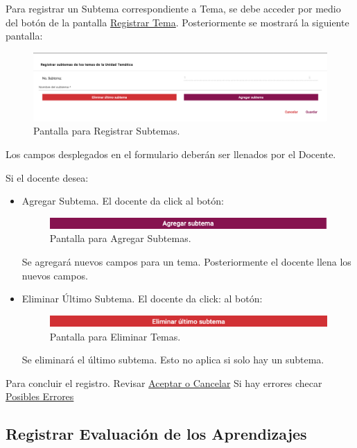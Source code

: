 Para registrar un Subtema correspondiente a Tema, se debe acceder por medio del botón  de la pantalla \hyperlink{RTema}{Registrar Tema}. Posteriormente se mostrará la siguiente pantalla:

\begin{figure}[H]
    \centering
    \includegraphics[width=0.7\linewidth]{images/SP6/RegistrarSubtema.png}
    \caption{Pantalla para Registrar Subtemas.}
\end{figure}

Los campos desplegados en el formulario deberán ser llenados por el Docente.

Si el docente desea:
\begin{itemize}
    \item Agregar Subtema. El docente da click al botón:
    \begin{figure}[H]
    \centering
    \includegraphics[width=0.4\linewidth]{images/SP6/AgregarSubtema.png}
    \caption{Pantalla para Agregar Subtemas.}
    \end{figure}
    Se agregará nuevos campos para un tema. Posteriormente el docente llena los nuevos campos.
    \item Eliminar Último Subtema. El docente da click: al botón:
    \begin{figure}[H]
    \centering
    \includegraphics[width=0.4\linewidth]{images/SP6/EliminarSubtema.png}
    \caption{Pantalla para Eliminar Temas.}
    \end{figure}
    Se eliminará el último subtema. Esto no aplica si solo hay un subtema.
\end{itemize}

Para concluir el registro. Revisar \hyperlink{AceptarCancelar}{Aceptar o Cancelar}
Si hay errores checar \hyperlink{Errores}{Posibles Errores}

\pagebreak
\hypertarget{RegistrarEvalAprend}{\subsection{Registrar Evaluación de los Aprendizajes}}

